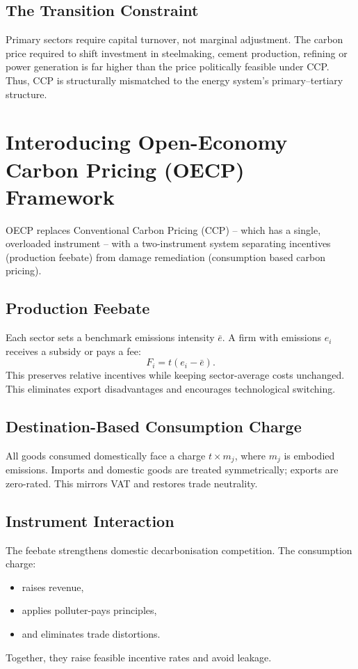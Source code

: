 \documentclass[12pt]{article}
\begin{document}
\subsection{The Transition Constraint}

Primary sectors require capital turnover, not marginal adjustment.  
The carbon price required to shift investment in steelmaking, cement production, 
refining or power generation is far higher than the price politically feasible 
under CCP.  
Thus, CCP is structurally mismatched to the energy system’s 
primary–tertiary structure.


\section{Interoducing Open-Economy Carbon Pricing (OECP) Framework}

OECP replaces Conventional Carbon Pricing (CCP) -- which has a single, overloaded instrument  -- with a two-instrument system separating incentives (production feebate) from damage remediation (consumption based carbon pricing).

\subsection{Production Feebate}

Each sector sets a benchmark emissions intensity $\bar e$.  
A firm with emissions $e_i$ receives a subsidy or pays a fee:
\[
F_i = t(e_i - \bar e).
\]
This preserves relative incentives while keeping sector-average costs unchanged.  
This eliminates export disadvantages and encourages technological switching.

\subsection{Destination-Based Consumption Charge}

All goods consumed domestically face a charge $t \times m_j$, 
where $m_j$ is embodied emissions.  
Imports and domestic goods are treated symmetrically; exports are zero-rated.  
This mirrors VAT and restores trade neutrality.

\subsection{Instrument Interaction}

The feebate strengthens domestic decarbonisation competition.  
The consumption charge:
\begin{itemize}
    \item raises revenue,  
    \item applies polluter-pays principles,  
    \item and eliminates trade distortions.
\end{itemize}
Together, they raise feasible incentive rates and avoid leakage.
\end{document}
